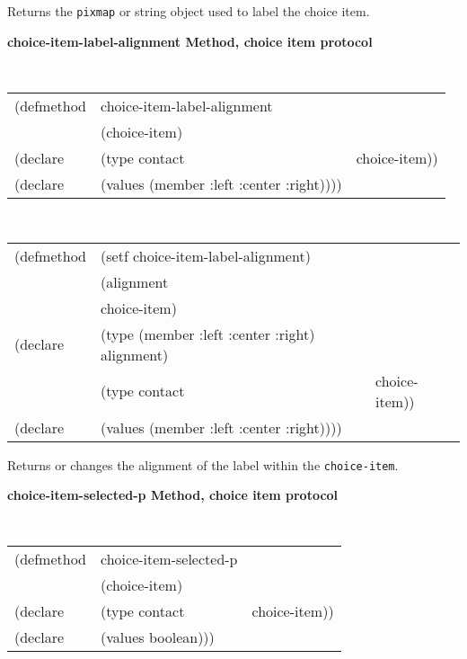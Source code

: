 \begin{flushright} \parbox[t]{6.125in}{ Returns the {\tt pixmap} or string
object used to label the choice item.

}\end{flushright}


{\samepage  
{\large {\bf choice-item-label-alignment \hfill Method, choice item protocol}}
\begin{flushright} \parbox[t]{6.125in}{
\tt
\begin{tabular}{lll}
\raggedright
(defmethod & choice-item-label-alignment & \\
& (choice-item) \\
(declare &(type contact & choice-item))\\
(declare & (values (member :left :center :right))))
\end{tabular}
\rm

}\end{flushright}}

\begin{flushright} \parbox[t]{6.125in}{
\tt
\begin{tabular}{lll}
\raggedright
(defmethod & (setf choice-item-label-alignment) & \\
         & (alignment \\
         & choice-item) \\
(declare &(type (member :left :center :right)  alignment)\\
         &(type contact & choice-item))\\
(declare & (values (member :left :center :right))))
\end{tabular}
\rm}
\end{flushright}

\begin{flushright} \parbox[t]{6.125in}{
Returns or changes the alignment of the label within the {\tt choice-item}.}
\end{flushright}


{\samepage
{\large {\bf choice-item-selected-p \hfill Method, choice item protocol}}
\begin{flushright} \parbox[t]{6.125in}{
\tt
\begin{tabular}{lll}
\raggedright
(defmethod & choice-item-selected-p & \\
& (choice-item) \\
(declare &(type contact & choice-item))\\
(declare & (values boolean)))
\end{tabular}
\rm

}\end{flushright}}

